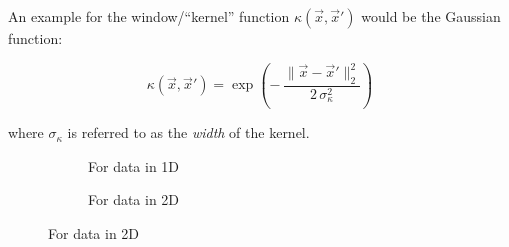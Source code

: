 \begin{frame}

An example for the window/``kernel'' function $\kappa(\vec x, \vec x')$ would be the Gaussian function:

\begin{equation}
\kappa(\vec x, \vec x') = \exp\left( -\,\frac{\lVert \vec x - \vec x'\rVert^2_2}{2\,\sigma_{\kappa}^2} \right)
\label{eq:gauss_kernel}
\end{equation}

where $\sigma_{\kappa}$ is referred to as the \emph{width} of the kernel.

\begin{figure}[ht]
     \centering
     \begin{subfigure}[t]{0.37\textwidth}
         \centering
         \usebox{\imagebox}%
         \caption{For data in 1D}
         \label{fig:quadratic}
     \end{subfigure}
     \hspace{2mm}
     \begin{subfigure}[t]{0.37\textwidth}
         \centering
         \caption{For data in 2D}
         \label{fig:linear}
     \end{subfigure}
	 \label{fig:quadratic_density_gaussian}
\end{figure}

\end{frame}

